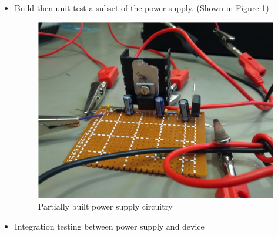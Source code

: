 \documentclass[12pt,letterpaper]{article}
\begin{document}
\begin{itemize}
\item Build then unit test a subset of the power supply. (Shown in Figure \ref{fig:powersupply1})
\begin{figure}[H]
\centering
\includegraphics[page=1, totalheight=7cm]{images/powersupply.png}
\caption{Partially built power supply circuitry}
\label{fig:powersupply1}
\end{figure}

\item Integration testing between power supply and device


\end{itemize}
\end{document}
